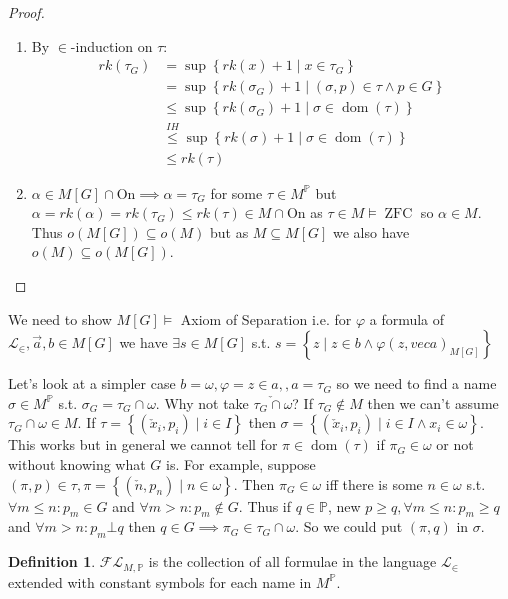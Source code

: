 \documentclass{scrartcl}
\renewcommand{\L}{\mathcal{L}}
\newcommand{\Le}{\L_\in}
\newcommand{\set}[1]{\left\{#1\right\}}
\DeclareMathOperator{\ZFC}{ZFC}
\DeclareMathOperator{\dom}{dom}
\theoremstyle{definition}
\newtheorem*{definition*}{Definition}
\theoremstyle{plain}
\theoremstyle{remark}
\begin{document}
	\begin{proof}
		\begin{enumerate}[(1)]
			\item By $\in$-induction on $\tau$:
			\begin{align*}
				rk(\tau_G) &= \sup\set{rk(x)+1 \mid x \in \tau_G}\\ 
				&= \sup\set{rk(\sigma_G)+1 \mid (\sigma, p) \in \tau \land p \in G}\\
				&\leq \sup\set{rk(\sigma_G)+1 \mid \sigma \in \dom(\tau)}\\
				&\overset{IH}\leq \sup\set{rk(\sigma)+1 \mid \sigma \in \dom(\tau)}\\
				&\leq rk(\tau)
			\end{align*}

			\item $\alpha \in M[G] \cap \text{On} \implies \alpha = \tau_G$ for some $\tau \in M^\mathbb{P}$
			but $\alpha = rk(\alpha) = rk(\tau_G) \leq rk(\tau) \in M \cap \text{On}$ as $\tau \in M \vDash \ZFC$ so $\alpha \in M$.
			Thus $o(M[G]) \subseteq o(M)$ but as $M \subseteq M[G]$ we also have $o(M) \subseteq o(M[G])$.
		\end{enumerate}
	\end{proof}

	We need to show $M[G] \vDash $ Axiom of Separation i.e. for $\varphi$ a formula of $\Le, \vec{a}, b \in M[G]$ we have $\exists s \in M[G]$
	s.t. $s = \set{z \mid z \in b \land \varphi(z, vec{a})_{M[G]}}$

	Let's look at a simpler case $b = \omega, \varphi = z \in a,, a = \tau_G$ so we need to find a name $\sigma \in M^\mathbb{P}$ s.t.
	$\sigma_G = \tau_G \cap \omega$. Why not take $\check{\tau_G \cap \omega}$? If $\tau_G \notin M$ then we can't assume $\tau_G \cap \omega \in M$.
	If $\tau = \set{(\check{x}_i, p_i) \mid i \in I}$ then $\sigma = \set{(\check{x}_i, p_i) \mid i \in I \land x_i \in \omega}$.
	This works but in general we cannot tell for $\pi \in \dom(\tau)$ if $\pi_G \in \omega$ or not without knowing
	what $G$ is. For example, suppose $(\pi, p) \in \tau, \pi = \set{(\check{n}, p_n) \mid n \in \omega}$. Then $\pi_G \in \omega$ iff 
	there is some $n \in \omega$ s.t. $\forall m \leq n: p_m \in G$ and $\forall m > n:p_m \notin G$. Thus if $q \in \mathbb{P}$,
	new $p \geq q, \forall m \leq n: p_m \geq q$ and $\forall m > n:p_m \bot q $ then $q \in G \implies \pi_G \in \tau_G \cap \omega$.
	So we could put $(\pi, q)$ in $\sigma$.

	\begin{definition*}
		$\mathcal{FL}_{M, \mathbb{P}}$ is the collection of all formulae in the language $\Le$ extended with constant symbols for each name
		in $M^\mathbb{P}$.
	\end{definition*}
\end{document}
